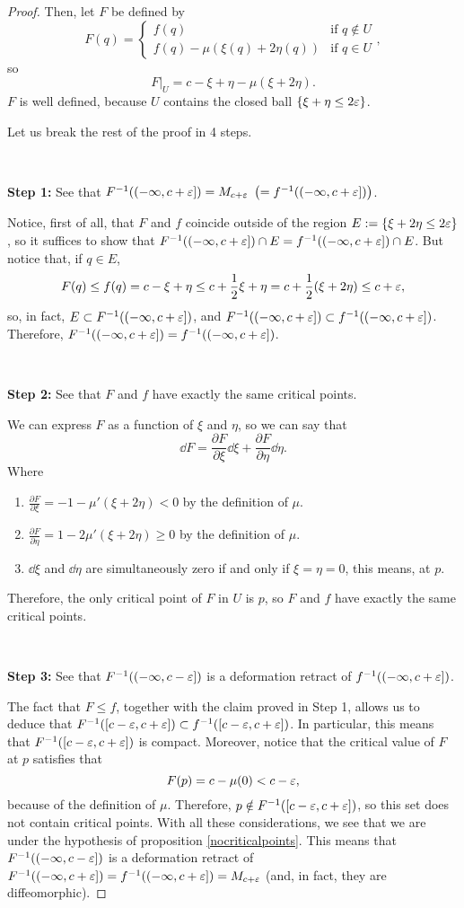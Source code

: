 \begin{proof}
Then, let $F$ be defined by
$$F(q) = \left\{ \begin{array}{ll} f(q) & \text{if } q \notin U \\ f(q) - \mu(\xi(q) + 2\eta(q)) & \text{if } q \in U \end{array} \right. ,$$
so
$$\left. F \right|_U = c - \xi + \eta - \mu(\xi + 2\eta) .$$
$F$ is well defined, because $U$ contains the closed ball $\{ \xi + \eta \leq 2\varepsilon \}$.

Let us break the rest of the proof in 4 steps.

\

{\bf Step 1:} See that $F^{-1}((-\infty,c+\varepsilon]) = M_{c+\varepsilon} \ \left( = f^{-1}((-\infty,c+\varepsilon]) \right)$.

Notice, first of all, that $F$ and $f$ coincide outside of the region $E:=\{ \xi + 2\eta \leq 2\varepsilon\}$, so it suffices to show that $F^{-1}((-\infty,c+\varepsilon]) \cap E = f^{-1}((-\infty,c+\varepsilon]) \cap E$. But notice that, if $q \in E$,
$$F(q) \leq f(q) = c - \xi + \eta \leq c + \frac12 \xi + \eta = c + \frac12 (\xi + 2\eta) \leq c + \varepsilon ,$$
so, in fact, $E \subset F^{-1}((-\infty,c+\varepsilon])$, and $F^{-1}((-\infty,c+\varepsilon]) \subset f^{-1}((-\infty,c+\varepsilon])$. Therefore, $F^{-1}((-\infty,c+\varepsilon]) = f^{-1}((-\infty,c+\varepsilon])$.

\

{\bf Step 2:} See that $F$ and $f$ have exactly the same critical points.

We can express $F$ as a function of $\xi$ and $\eta$, so we can say that
$$\dd F = \frac{\partial F}{\partial \xi} \dd \xi + \frac{\partial F}{\partial \eta} \dd \eta .$$
Where

\begin{enumerate}
	\item $\frac{\partial F}{\partial \xi} = -1 - \mu'(\xi+2\eta) < 0$ by the definition of $\mu$.
	\item $\frac{\partial F}{\partial \eta} = 1 - 2 \mu'(\xi+2\eta) \geq 0$ by the definition of $\mu$.
	\item $\dd \xi$ and $\dd \eta$ are simultaneously zero if and only if $\xi = \eta = 0$, this means, at $p$.
\end{enumerate}

Therefore, the only critical point of $F$ in $U$ is $p$, so $F$ and $f$ have exactly the same critical points.

\

{\bf Step 3:} See that $F^{-1}((-\infty,c-\varepsilon])$ is a deformation retract of $f^{-1}((-\infty,c+\varepsilon])$.

The fact that $F \leq f$, together with the claim proved in Step 1, allows us to deduce that $F^{-1}([c-\varepsilon,c+\varepsilon]) \subset f^{-1}([c-\varepsilon,c+\varepsilon])$. In particular, this means that $F^{-1}([c-\varepsilon,c+\varepsilon])$ is compact. Moreover, notice that the critical value of $F$ at $p$ satisfies that
$$F(p) = c - \mu(0) < c - \varepsilon ,$$
because of the definition of $\mu$. Therefore, $p \notin F^{-1}([c-\varepsilon,c+\varepsilon])$, so this set does not contain critical points. With all these considerations, we see that we are under the hypothesis of proposition \ref{nocriticalpoints}. This means that $F^{-1}((-\infty,c-\varepsilon])$ is a deformation retract of $F^{-1}((-\infty,c+\varepsilon]) = f^{-1}((-\infty,c+\varepsilon]) = M_{c+\varepsilon}$ (and, in fact, they are diffeomorphic).


\end{proof}
